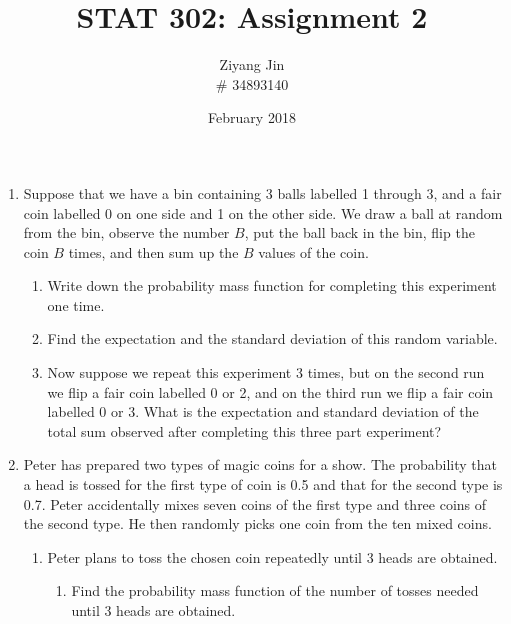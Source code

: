 \documentclass[11pt]{article}
\title{STAT 302: Assignment 2}
\author{Ziyang Jin \\
\# 34893140}
\date{February 2018}
\begin{document}
\maketitle

\begin{enumerate}[label=\textbf{Q \arabic*:},start=1]

\item Suppose that we have a bin containing 3 balls labelled 1 through 3, and a fair coin labelled 0 on one side and 1 on the other side. We draw a ball at random from the bin, observe the number $B$, put the ball back in the bin, flip the coin $B$ times, and then sum up the $B$ values of the coin. \\
\begin{enumerate}
\item Write down the probability mass function for completing this experiment one time.\\

\item Find the expectation and the standard deviation of this random variable.\\

\item Now suppose we repeat this experiment 3 times, but on the second run we flip a fair coin labelled 0 or 2, and on the third run we flip a fair coin labelled 0 or 3. What is the expectation and standard deviation of the total sum observed after completing this three part experiment?

\end{enumerate}



\item
Peter has prepared two types of magic coins for a show. The probability that a head is tossed for the first type of coin is 0.5 and that for the second type is 0.7. Peter accidentally mixes seven coins of the first type and three coins of the second type. 
He then randomly picks one coin from the ten mixed coins.
\begin{enumerate}
  \item Peter plans to toss the chosen coin repeatedly until 3 heads are obtained.
  \begin{enumerate}
    \item Find the probability mass function of the number of tosses needed until 3 heads are obtained.\\




\end{enumerate}
\end{enumerate}
\end{enumerate}
\end{document}
